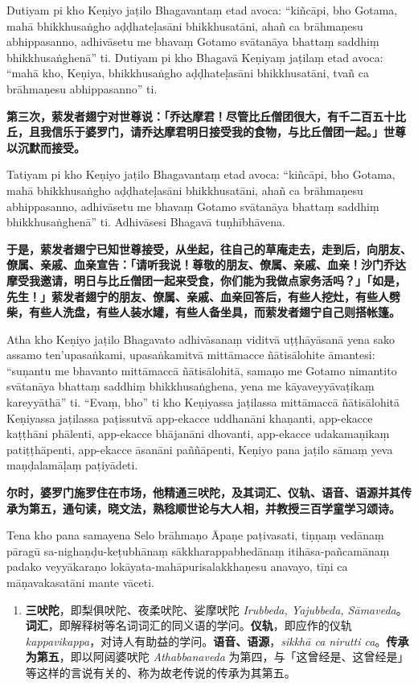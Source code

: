 Dutiyam pi kho Keṇiyo jaṭilo Bhagavantaṃ etad avoca: “kiñcāpi, bho Gotama, mahā bhikkhusaṅgho aḍḍhateḷasāni bhikkhusatāni, ahañ ca brāhmaṇesu abhippasanno, adhivāsetu me bhavaṃ Gotamo svātanāya bhattaṃ saddhiṃ bhikkhusaṅghenā” ti. Dutiyam pi kho Bhagavā Keṇiyaṃ jaṭilaṃ etad avoca: “mahā kho, Keṇiya, bhikkhusaṅgho aḍḍhateḷasāni bhikkhusatāni, tvañ ca brāhmaṇesu abhippasanno” ti.

\textbf{第三次，萦发者翅宁对世尊说：「乔达摩君！尽管比丘僧团很大，有千二百五十比丘，且我信乐于婆罗门，请乔达摩君明日接受我的食物，与比丘僧团一起。」世尊以沉默而接受。}

Tatiyam pi kho Keṇiyo jaṭilo Bhagavantaṃ etad avoca: “kiñcāpi, bho Gotama, mahā bhikkhusaṅgho aḍḍhateḷasāni bhikkhusatāni, ahañ ca brāhmaṇesu abhippasanno, adhivāsetu me bhavaṃ Gotamo svātanāya bhattaṃ saddhiṃ bhikkhusaṅghenā” ti. Adhivāsesi Bhagavā tuṇhībhāvena.

\textbf{于是，萦发者翅宁已知世尊接受，从坐起，往自己的草庵走去，走到后，向朋友、僚属、亲戚、血亲宣告：「请听我说！尊敬的朋友、僚属、亲戚、血亲！沙门乔达摩受我邀请，明日与比丘僧团一起来受食，你们能为我做点家务活吗？」「如是，先生！」萦发者翅宁的朋友、僚属、亲戚、血亲回答后，有些人挖灶，有些人劈柴，有些人洗盘，有些人装水罐，有些人备坐具，而萦发者翅宁自己则搭帐篷。}

Atha kho Keṇiyo jaṭilo Bhagavato adhivāsanaṃ viditvā uṭṭhāyāsanā yena sako assamo ten’upasaṅkami, upasaṅkamitvā mittāmacce ñātisālohite āmantesi: “suṇantu me bhavanto mittāmaccā ñātisālohitā, samaṇo me Gotamo nimantito svātanāya bhattaṃ saddhiṃ bhikkhusaṅghena, yena me kāyaveyyāvaṭikaṃ kareyyāthā” ti. “Evaṃ, bho” ti kho Keṇiyassa jaṭilassa mittāmaccā ñātisālohitā Keṇiyassa jaṭilassa paṭissutvā app-ekacce uddhanāni khaṇanti, app-ekacce kaṭṭhāni phālenti, app-ekacce bhājanāni dhovanti, app-ekacce udakamaṇikaṃ patiṭṭhāpenti, app-ekacce āsanāni paññāpenti, Keṇiyo pana jaṭilo sāmaṃ yeva maṇḍalamāḷaṃ paṭiyādeti.

\textbf{尔时，婆罗门施罗住在市场，他精通三吠陀，及其词汇、仪轨、语音、语源并其传承为第五，通句读，晓文法，熟稔顺世论与大人相，并教授三百学童学习颂诗。}

Tena kho pana samayena Selo brāhmaṇo Āpaṇe paṭivasati, tiṇṇaṃ vedānaṃ pāragū sa-nighaṇḍu-keṭubhānaṃ sākkharappabhedānaṃ itihāsa-pañcamānaṃ padako veyyākaraṇo lokāyata-mahāpurisalakkhaṇesu anavayo, tīṇi ca māṇavakasatāni mante vāceti.

\begin{enumerate}\item \textbf{三吠陀}，即梨俱吠陀、夜柔吠陀、娑摩吠陀 \textit{Irubbeda, Yajubbeda, Sāmaveda}。\textbf{词汇}，即解释树等名词词汇的同义语的学问。\textbf{仪轨}，即应作的仪轨 \textit{kappavikappa}，对诗人有助益的学问。\textbf{语音、语源}，\textit{sikkhā ca nirutti ca}。\textbf{传承为第五}，即以阿闼婆吠陀 \textit{Athabbanaveda} 为第四，与「这曾经是、这曾经是」等这样的言说有关的、称为故老传说的传承为其第五。\end{enumerate}

